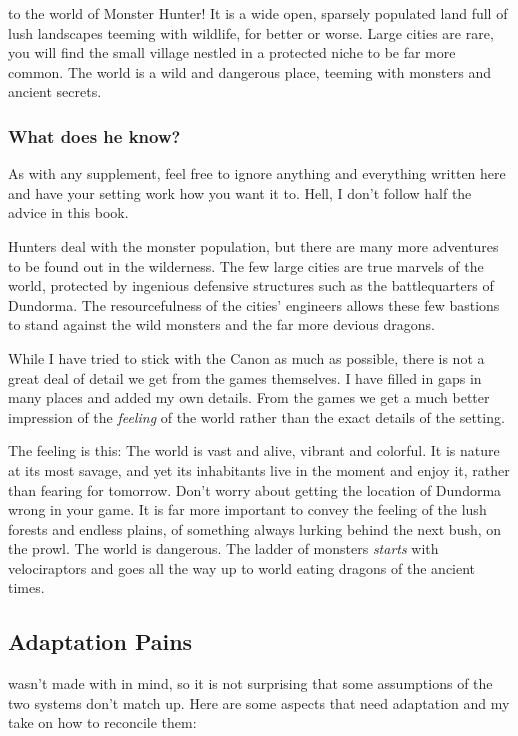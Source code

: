 

 to the world of Monster Hunter! It is a wide open, sparsely populated land full of lush landscapes teeming with wildlife, for better or worse. Large cities are rare, you will find the small village nestled in a protected niche to be far more common. The world is a wild and dangerous place, teeming with monsters and ancient secrets.

\begin{hbNote}[t]
\subsubsection*{What does he know?}
\noindent As with any supplement, feel free to ignore anything and everything written here and have your setting work how you want it to. Hell, I don't follow half the advice in this book.
\end{hbNote}

Hunters deal with the monster population, but there are many more adventures to be found out in the wilderness. The few large cities are true marvels of the world, protected by ingenious defensive structures such as the battlequarters of Dundorma. The resourcefulness of the cities' engineers allows these few bastions to stand against the wild monsters and the far more devious dragons.

While I have tried to stick with the \MH{} Canon as much as possible, there is not a great deal of detail we get from the games themselves. I have filled in gaps in many places and added my own details. From the games we get a much better impression of the \emph{feeling} of the world rather than the exact details of the setting.

The feeling is this: The world is vast and alive, vibrant and colorful. It is nature at its most savage, and yet its inhabitants live in the moment and enjoy it, rather than fearing for tomorrow. Don't worry about getting the location of Dundorma wrong in your game. It is far more important to convey the feeling of the lush forests and endless plains, of something always lurking behind the next bush, on the prowl. The world is dangerous. The ladder of monsters \emph{starts} with velociraptors and goes all the way up to world eating dragons of the ancient times.

\subsection{Adaptation Pains}
\MH{} wasn't made with \DND{} in mind, so it is not surprising that some assumptions of the two systems don't match up. Here are some aspects that need adaptation and my take on how to reconcile them:

